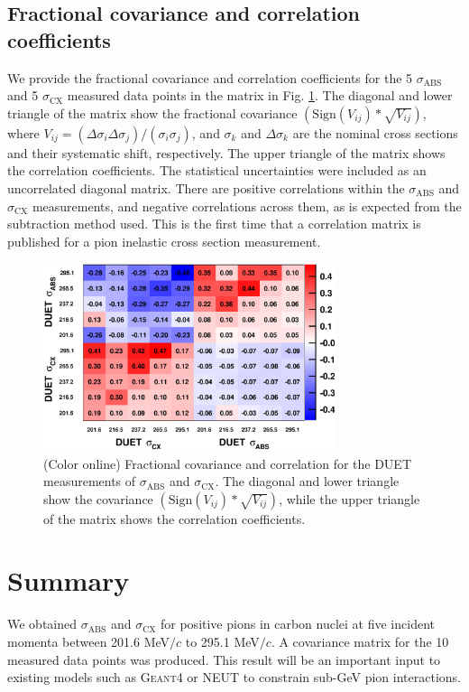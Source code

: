 \subsection{Fractional covariance and correlation coefficients}
We provide the fractional covariance and correlation coefficients for the 5 $\sigma_{\mathrm{ABS}}$ and 5 $\sigma_{\mathrm{CX}}$ measured data points in the matrix in Fig. \ref{fig:covariance}. The diagonal and lower triangle of the matrix show the fractional covariance $(\mathrm{Sign}(V_{ij})*\sqrt{V_{ij}})$, where $V_{ij} = (\Delta\sigma_{i}\Delta\sigma_{j})/(\sigma_{i}\sigma_{j})$, and $\sigma_{k}$ and $\Delta\sigma_{k}$ are the nominal cross sections and their systematic shift, respectively. The upper triangle of the matrix shows the correlation coefficients.
The statistical uncertainties were included as an uncorrelated diagonal matrix. There are positive correlations within the $\sigma_{\mathrm{ABS}}$ and $\sigma_{\mathrm{CX}}$ measurements, and negative correlations across them, as is expected from the subtraction method used. This is the first time that a correlation matrix is published for a pion inelastic cross section measurement. 

\begin{figure}[h]
\begin{center}
\includegraphics[width=86mm]{figures/duet_fractional_covariance_forpaper_v4.eps}
\caption{(Color online) Fractional covariance and correlation for the DUET measurements of $\sigma_{\mathrm{ABS}}$ and $\sigma_{\mathrm{CX}}$. The  diagonal and lower triangle show the covariance $(\mathrm{Sign}(V_{ij})*\sqrt{V_{ij}})$, while the upper triangle of the matrix shows the correlation coefficients.}
\label{fig:covariance}
\end{center} 
\end{figure}

\section{Summary}
We obtained $\sigma_{\mathrm{ABS}}$ and $\sigma_{\mathrm{CX}}$ for positive pions in carbon nuclei at five incident momenta between 201.6 MeV$/c$ to 295.1 MeV$/c$. A covariance matrix for the 10 measured data points was produced. This result will be an important input to existing models such as \textsc{Geant4} or \textsc{NEUT} to constrain sub-GeV pion interactions.
